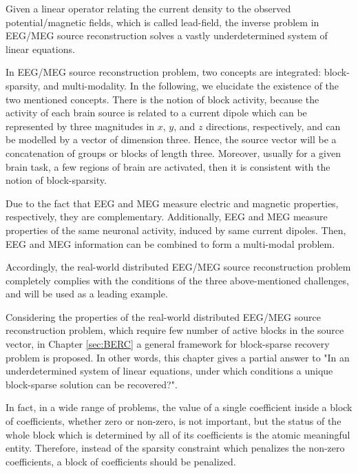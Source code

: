 Given a linear operator relating the current density to the observed potential/magnetic fields, which is called lead-field, the inverse problem in EEG/MEG source reconstruction solves a vastly underdetermined system of linear equations.


In EEG/MEG source reconstruction problem, two concepts are integrated: block-sparsity, and multi-modality.
In the following, we elucidate the existence of the two mentioned concepts.
There is the notion of block activity, because the activity of each brain source is related to a current dipole which can be represented by three magnitudes in $x$, $y$, and $z$ directions, respectively, and can be modelled by a vector of dimension three.
Hence, the source vector will be a concatenation of groups or blocks of length three.
Moreover, usually for a given brain task, a few regions of brain are activated, then it is consistent with the notion of block-sparsity. 

Due to the fact that EEG and MEG measure electric and magnetic properties, respectively, they are complementary.
Additionally, EEG and MEG measure properties of the same neuronal activity, induced by same current dipoles.
Then, EEG and MEG information can be combined to form a multi-modal problem.

Accordingly, the real-world distributed EEG/MEG source reconstruction problem completely complies with the conditions of the three above-mentioned challenges, and will be used as a leading example.

Considering the properties of the real-world distributed EEG/MEG source reconstruction problem, which require few number of active blocks in the source vector, in Chapter \ref{sec:BERC} a general framework for block-sparse recovery problem is proposed.
In other words, this chapter gives a partial answer to "In an underdetermined system of linear equations, under which conditions a unique block-sparse solution can be recovered?".

In fact, in a wide range of problems, the value of a single coefficient inside a block of coefficients, whether zero or non-zero, is not important, but the status of the whole block which is determined by all of its coefficients is the atomic meaningful entity.
Therefore, instead of the sparsity constraint which penalizes the non-zero coefficients, a block of coefficients should be penalized.

